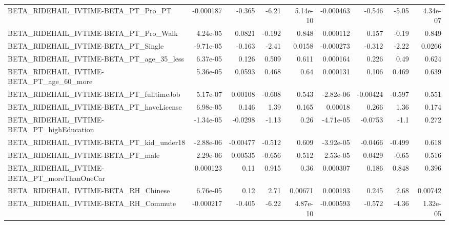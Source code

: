 \begin{tabular}{lrrrrrrrr}
BETA\_RIDEHAIL\_IVTIME-BETA\_PT\_Pro\_PT                &   -0.000187 &       -0.365 &    -6.21 & 5.14e-10 &  -0.000463 &      -0.546 &        -5.05 &      4.34e-07 \\
BETA\_RIDEHAIL\_IVTIME-BETA\_PT\_Pro\_Walk              &    4.24e-05 &       0.0821 &   -0.192 &    0.848 &   0.000112 &       0.157 &        -0.19 &         0.849 \\
BETA\_RIDEHAIL\_IVTIME-BETA\_PT\_Single                &   -9.71e-05 &       -0.163 &    -2.41 &   0.0158 &  -0.000273 &      -0.312 &        -2.22 &        0.0266 \\
BETA\_RIDEHAIL\_IVTIME-BETA\_PT\_age\_35\_less           &    6.37e-05 &        0.126 &    0.509 &    0.611 &   0.000164 &       0.226 &         0.49 &         0.624 \\
BETA\_RIDEHAIL\_IVTIME-BETA\_PT\_age\_60\_more           &    5.36e-05 &       0.0593 &    0.468 &     0.64 &   0.000131 &       0.106 &        0.469 &         0.639 \\
BETA\_RIDEHAIL\_IVTIME-BETA\_PT\_fulltimeJob           &    5.17e-07 &      0.00108 &   -0.608 &    0.543 &  -2.82e-06 &    -0.00424 &       -0.597 &         0.551 \\
BETA\_RIDEHAIL\_IVTIME-BETA\_PT\_haveLicense           &    6.98e-05 &        0.146 &     1.39 &    0.165 &    0.00018 &       0.266 &         1.36 &         0.174 \\
BETA\_RIDEHAIL\_IVTIME-BETA\_PT\_highEducation         &   -1.34e-05 &      -0.0298 &    -1.13 &     0.26 &  -4.71e-05 &     -0.0753 &         -1.1 &         0.272 \\
BETA\_RIDEHAIL\_IVTIME-BETA\_PT\_kid\_under18           &   -2.88e-06 &     -0.00477 &   -0.512 &    0.609 &  -3.92e-05 &     -0.0466 &       -0.499 &         0.618 \\
BETA\_RIDEHAIL\_IVTIME-BETA\_PT\_male                  &    2.29e-06 &      0.00535 &   -0.656 &    0.512 &   2.53e-05 &      0.0429 &        -0.65 &         0.516 \\
BETA\_RIDEHAIL\_IVTIME-BETA\_PT\_moreThanOneCar        &    0.000123 &         0.11 &    0.915 &     0.36 &   0.000307 &       0.186 &        0.848 &         0.396 \\
BETA\_RIDEHAIL\_IVTIME-BETA\_RH\_Chinese               &    6.76e-05 &         0.12 &     2.71 &  0.00671 &   0.000193 &       0.245 &         2.68 &       0.00742 \\
BETA\_RIDEHAIL\_IVTIME-BETA\_RH\_Commute               &   -0.000217 &       -0.405 &    -6.22 & 4.87e-10 &  -0.000593 &      -0.572 &        -4.36 &      1.32e-05 \\

\end{tabular}
